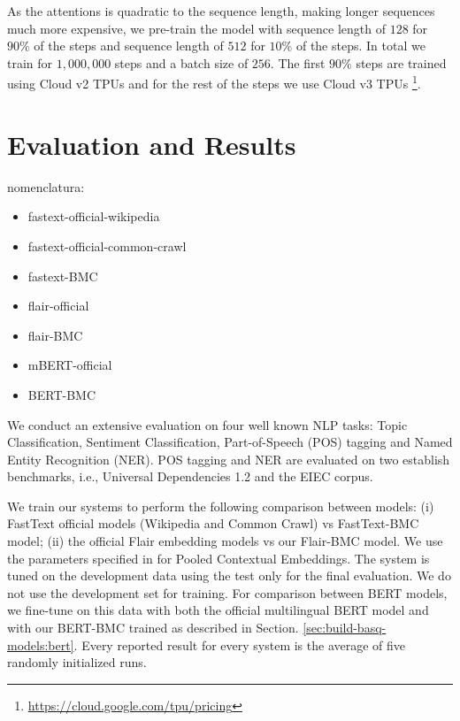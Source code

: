 \documentclass[10pt, a4paper]{article}
\begin{document}
As the attentions is quadratic to the sequence length, making longer sequences much more expensive, we pre-train the model with sequence length of $128$ for $90\%$ of the steps and sequence length of $512$ for $10\%$ of the steps. In total we train for $1,000,000$ steps and a batch size of $256$. The first $90\%$ steps are trained using Cloud v2 TPUs and for the rest of the steps we use Cloud v3 TPUs \footnote{\url{https://cloud.google.com/tpu/pricing}}. 


\section{Evaluation and Results}\label{sec:eval-results}


nomenclatura: \begin{itemize}
    \item fastext-official-wikipedia
    \item fastext-official-common-crawl
    \item fastext-BMC
    \item flair-official
    \item flair-BMC
    \item mBERT-official
    \item BERT-BMC
\end{itemize}







We conduct an extensive evaluation on four well known NLP tasks: Topic Classification, Sentiment Classification, Part-of-Speech (POS) tagging and Named Entity Recognition (NER). POS tagging and NER are evaluated on two establish benchmarks, i.e., Universal Dependencies 1.2 and the EIEC corpus. 

We train our systems to perform the following comparison between models: (i) FastText official models (Wikipedia and Common Crawl) vs FastText-BMC model; (ii) the official Flair embedding models vs our Flair-BMC model. We use the parameters specified in \cite{akbik2019naacl} for Pooled Contextual Embeddings. The system is tuned on the development data using the test only for the final evaluation. We do not use the development set for training. For comparison between BERT models, we fine-tune on this data with both the official multilingual BERT \cite{devlin2019bert} model and with our BERT-BMC trained as described in Section.  \ref{sec:build-basq-models:bert}. Every reported result for every system is the average of five randomly initialized runs.
\end{document}
